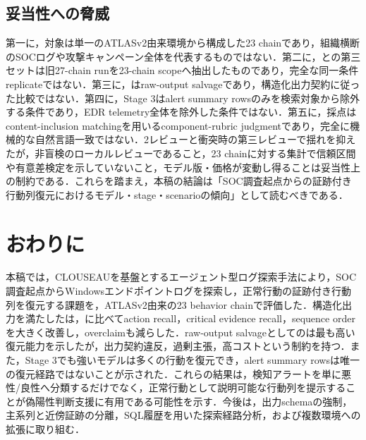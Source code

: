 \subsection{妥当性への脅威}

第一に，対象は単一のATLASv2由来環境から構成した23 chainであり，組織横断のSOCログや攻撃キャンペーン全体を代表するものではない．第二に，との第三セットは旧27-chain runを23-chain scopeへ抽出したものであり，完全な同一条件replicateではない．第三に，はraw-output salvageであり，構造化出力契約に従った比較ではない．第四に，Stage 3はalert summary rowsのみを検索対象から除外する条件であり，EDR telemetry全体を除外した条件ではない．第五に，採点はcontent-inclusion matchingを用いるcomponent-rubric judgmentであり，完全に機械的な自然言語一致ではない．2レビューと衝突時の第三レビューで揺れを抑えたが，非盲検のローカルレビューであること，23 chainに対する集計で信頼区間や有意差検定を示していないこと，モデル版・価格が変動し得ることは妥当性上の制約である．これらを踏まえ，本稿の結論は「SOC調査起点からの証跡付き行動列復元におけるモデル・stage・scenarioの傾向」として読むべきである．

\section{おわりに}

本稿では，CLOUSEAUを基盤とするエージェント型ログ探索手法により，SOC調査起点からWindowsエンドポイントログを探索し，正常行動の証跡付き行動列を復元する課題を，ATLASv2由来の23 behavior chainで評価した．構造化出力を満たしたは，に比べてaction recall，critical evidence recall，sequence orderを大きく改善し，overclaimも減らした．raw-output salvageとしてのは最も高い復元能力を示したが，出力契約違反，過剰主張，高コストという制約を持つ．また，Stage 3でも強いモデルは多くの行動を復元でき，alert summary rowsは唯一の復元経路ではないことが示された．これらの結果は，検知アラートを単に悪性/良性へ分類するだけでなく，正常行動として説明可能な行動列を提示することが偽陽性判断支援に有用である可能性を示す．今後は，出力schemaの強制，主系列と近傍証跡の分離，SQL履歴を用いた探索経路分析，および複数環境への拡張に取り組む．


